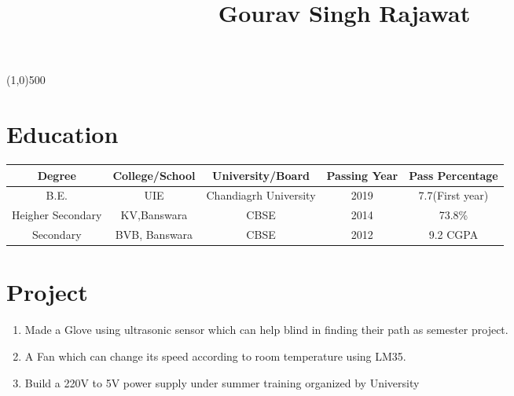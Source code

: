 \documentclass[11pt,a4paper]{article}
\def\sline{

    \vspace{-5.5em}
    \hspace{\fill}\line(1,0){500}\hspace{\fill}
}
\begin{document}
\title{Gourav Singh Rajawat}
\author{}
\date{}
\maketitle
\sline 
\begin{multicols}{2}
\columnbreak
{}
\end{multicols}

\section*{Education}
\vspace{-0.7em}\hline \vspace{1.5em}
	\begin{tabular}{|c|c|c|c|c|}
	\hline
	Degree & College/School & University/Board & Passing Year & Pass Percentage \\
	\hline
	B.E. &UIE &Chandiagrh University &2019 &7.7(First year) \\
	\hline
	Heigher Secondary &KV,Banswara &CBSE &2014 & 73.8\% \\ \hline
	Secondary &BVB, Banswara &CBSE &2012 &9.2 CGPA \\ \hline
	\end{tabular}	
	
	
\section*{Project}
\vspace{-0.7em}\hline \vspace{1.5em}
\begin{enumerate}

\item Made a Glove using ultrasonic sensor which can help blind in finding their path as semester project. 

\item A Fan which can change its speed according to room temperature using LM35. 

\item Build a 220V to 5V power supply under summer training organized by University
\end{enumerate}
\end{document}
